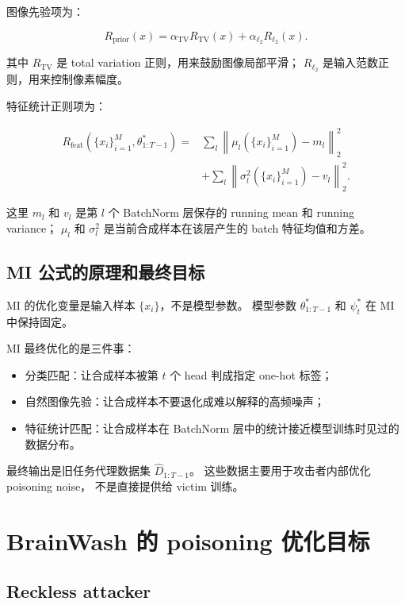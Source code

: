 \documentclass[11pt]{article}
\begin{document}
图像先验项为：

\[
R_{\mathrm{prior}}(x)
=
\alpha_{\mathrm{TV}}R_{\mathrm{TV}}(x)
+
\alpha_{\ell_2}R_{\ell_2}(x).
\]

其中 \(R_{\mathrm{TV}}\) 是 total variation 正则，用来鼓励图像局部平滑；
\(R_{\ell_2}\) 是输入范数正则，用来控制像素幅度。

特征统计正则项为：

\[
\begin{aligned}
R_{\mathrm{feat}}(\{x_i\}_{i=1}^{M},\theta_{1:T-1}^{*})
=
&
\sum_l
\left\|
\mu_l(\{x_i\}_{i=1}^{M})-m_l
\right\|_2^2 \\
&+
\sum_l
\left\|
\sigma_l^2(\{x_i\}_{i=1}^{M})-v_l
\right\|_2^2.
\end{aligned}
\]

这里 \(m_l\) 和 \(v_l\) 是第 \(l\) 个 BatchNorm 层保存的 running mean 和
running variance；
\(\mu_l\) 和 \(\sigma_l^2\) 是当前合成样本在该层产生的 batch 特征均值和方差。

\subsection{MI 公式的原理和最终目标}

MI 的优化变量是输入样本 \(\{x_i\}\)，不是模型参数。
模型参数 \(\theta_{1:T-1}^{*}\) 和 \(\psi_t^{*}\) 在 MI 中保持固定。

MI 最终优化的是三件事：

\begin{itemize}
  \item 分类匹配：让合成样本被第 \(t\) 个 head 判成指定 one-hot 标签；
  \item 自然图像先验：让合成样本不要退化成难以解释的高频噪声；
  \item 特征统计匹配：让合成样本在 BatchNorm 层中的统计接近模型训练时见过的数据分布。
\end{itemize}

最终输出是旧任务代理数据集 \(\hat{D}_{1:T-1}\)。
这些数据主要用于攻击者内部优化 poisoning noise，
不是直接提供给 victim 训练。

\section{BrainWash 的 poisoning 优化目标}

\subsection{Reckless attacker}
\end{document}
